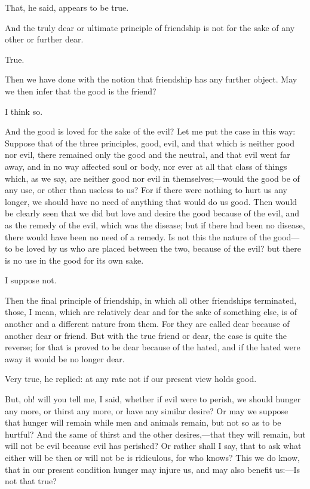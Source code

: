 \documentclass[11pt,letter]{article}
\begin{document}
\par  That, he said, appears to be true.

\par  And the truly dear or ultimate principle of friendship is not for the sake of any other or further dear.

\par  True.

\par  Then we have done with the notion that friendship has any further object. May we then infer that the good is the friend?

\par  I think so.

\par  And the good is loved for the sake of the evil? Let me put the case in this way: Suppose that of the three principles, good, evil, and that which is neither good nor evil, there remained only the good and the neutral, and that evil went far away, and in no way affected soul or body, nor ever at all that class of things which, as we say, are neither good nor evil in themselves;—would the good be of any use, or other than useless to us? For if there were nothing to hurt us any longer, we should have no need of anything that would do us good. Then would be clearly seen that we did but love and desire the good because of the evil, and as the remedy of the evil, which was the disease; but if there had been no disease, there would have been no need of a remedy. Is not this the nature of the good—to be loved by us who are placed between the two, because of the evil? but there is no use in the good for its own sake.

\par  I suppose not.

\par  Then the final principle of friendship, in which all other friendships terminated, those, I mean, which are relatively dear and for the sake of something else, is of another and a different nature from them. For they are called dear because of another dear or friend. But with the true friend or dear, the case is quite the reverse; for that is proved to be dear because of the hated, and if the hated were away it would be no longer dear.

\par  Very true, he replied: at any rate not if our present view holds good.

\par  But, oh! will you tell me, I said, whether if evil were to perish, we should hunger any more, or thirst any more, or have any similar desire? Or may we suppose that hunger will remain while men and animals remain, but not so as to be hurtful? And the same of thirst and the other desires,—that they will remain, but will not be evil because evil has perished? Or rather shall I say, that to ask what either will be then or will not be is ridiculous, for who knows? This we do know, that in our present condition hunger may injure us, and may also benefit us:—Is not that true?
\end{document}
